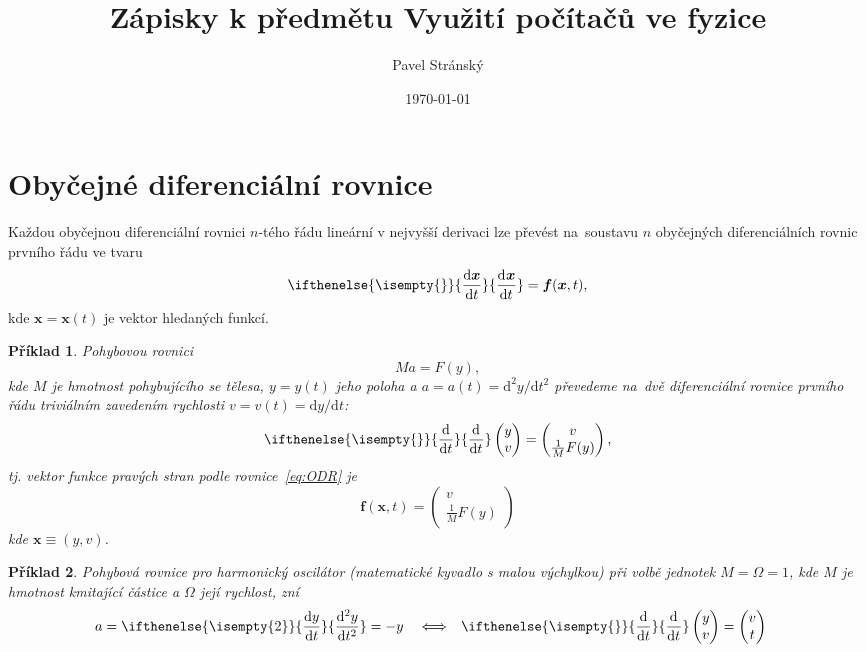 \documentclass[a4paper,11pt,twoside]{article}
\def\vector#1{\boldsymbol{#1}}								%
\renewcommand{\d}{\mathrm{d}}
\newcommand{\derivative}[3][]{\ifthenelse{\isempty{#1}}	    %
	{\frac{\d{#2}}{\d{#3}}}
	{\frac{\d^{#1}{#2}}{\d{#3}^{#1}}}
}
\def\makematrix#1{\begin{pmatrix}#1\end{pmatrix}}       %
\begin{document}
\theoremstyle{spaced}
\newtheorem{example}{Příklad}[section]

\theoremstyle{red}
\newtheorem{task}{Úkol}[section]

\theoremstyle{blue}
\newtheorem{solution}{Řešení}[section]

\title{Zápisky k předmětu Využití počítačů ve fyzice}
\date{\today}
\author{Pavel Stránský}

\maketitle
\tableofcontents

\section{Obyčejné diferenciální rovnice}
    Každou obyčejnou diferenciální rovnici $n$-tého řádu lineární v nejvyšší derivaci lze převést na~soustavu $n$ obyčejných diferenciálních rovnic prvního řádu ve tvaru
    \begin{equation}\label{eq:ODR}
        \derivative{\vector{x}}{t}=\vector{f}(\vector{x},t),
    \end{equation}
    kde $\vector{x}=\vector{x}(t)$ je vektor hledaných funkcí.

\begin{example}
    Pohybovou rovnici
    \begin{equation}
        Ma=F(y),
    \end{equation}
    kde $M$ je hmotnost pohybujícího se tělesa, $y=y(t)$ jeho poloha a $a=a(t)=\d^{2}y/\d t^{2}$ převedeme na~dvě diferenciální rovnice prvního řádu triviálním zavedením rychlosti $v=v(t)=\d y/\d t$:
    \begin{equation}
        \derivative{}{t}\makematrix{y \\ v}=\makematrix{v \\ \frac{1}{M}F(y)},
    \end{equation}
    tj. vektor funkce pravých stran podle rovnice~\eqref{eq:ODR} je
    \begin{equation}
        \vector{f}(\vector{x},t)=\makematrix{v \\ \frac{1}{M}F(y)}
    \end{equation}
    kde $\vector{x}\equiv(y,v)$.
\end{example}

\begin{example}
    Pohybová rovnice pro harmonický oscilátor (matematické kyvadlo s malou výchylkou) při volbě jednotek $M=\Omega=1$, kde $M$ je hmotnost kmitající částice a $\Omega$ její rychlost, zní
    \begin{align}
        a&=\derivative[2]{y}{t}=-y &&\Longleftrightarrow &
        \derivative{}{t}\makematrix{y \\ v}&=\makematrix{v \\ t}
    \end{align}

\end{example}
\end{document}

